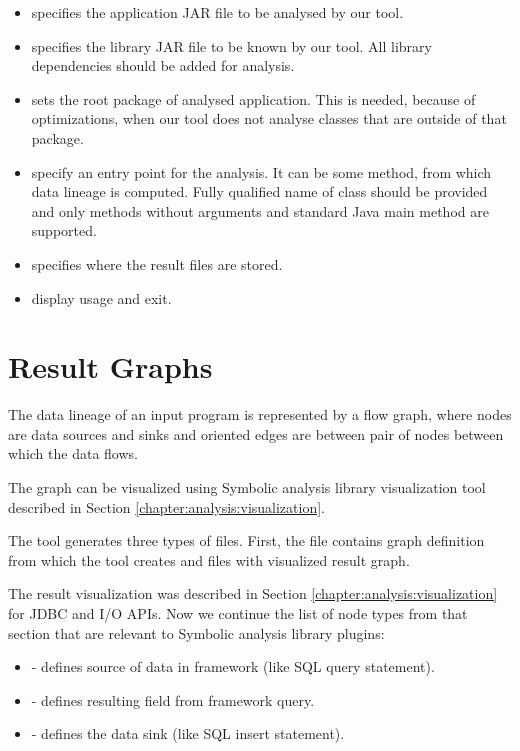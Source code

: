 \begin{itemize}
  \item {} specifies the application JAR file
    to be analysed by our \ToolName tool.
  \item {} specifies the library JAR file
    to be known by our \ToolName tool.
    All library dependencies should be added for analysis.
  \item {} sets the root package of analysed application.
    This is needed, because of optimizations, when our \ToolName tool
    does not analyse classes that are outside of that package.
  \item {} specify an entry point for the analysis.
    It can be some method, from which data lineage is computed.
    Fully qualified name of class should be provided and only methods
    without arguments and standard Java main method are supported.
  \item {} specifies where the result files are stored.
  \item {} display usage and exit.
\end{itemize}




\section{Result Graphs \label{chapter:program:graphs}}

The data lineage of an input program is represented by a flow graph,
where nodes are data sources and sinks and oriented edges are between
pair of nodes between which the data flows.

The graph can be visualized using Symbolic analysis library visualization tool
described in Section \ref{chapter:analysis:visualization}.

The \ToolName tool generates three types of files. First, the  file contains graph definition
from which the  tool creates  and  files with visualized result graph.

The result visualization was described in Section \ref{chapter:analysis:visualization}
for JDBC and I/O APIs.
Now we continue the list of node types from that section
that are relevant to Symbolic analysis library plugins:
\begin{itemize}
  \item {} - defines source of data in framework (like SQL query statement).
  \item {} - defines resulting field from framework query.
  \item {} - defines the data sink (like SQL insert statement).
\end{itemize}

